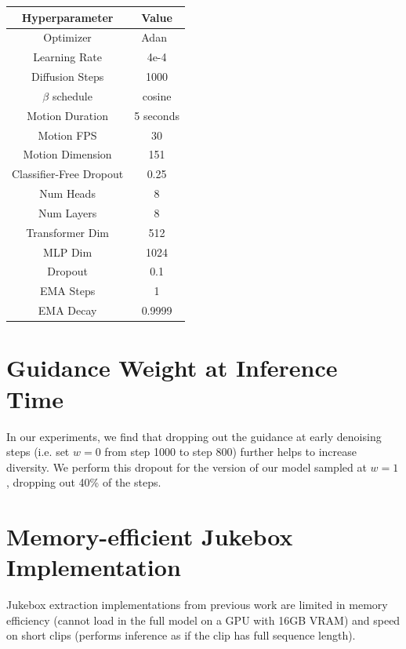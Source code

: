 \begin{tabular}{c|c} 
 \hline
 Hyperparameter & Value \\
 \hline
 Optimizer & Adan~\cite{xie2022adan} \\ 

 Learning Rate & 4e-4 \\

 Diffusion Steps & 1000 \\

 $\beta$ schedule & cosine \\

 Motion Duration & 5 seconds\\

 Motion FPS & 30\\

 Motion Dimension & 151\\

 Classifier-Free Dropout & 0.25\\

 Num Heads & 8\\

 Num Layers & 8\\

 Transformer Dim & 512\\

 MLP Dim & 1024\\

 Dropout & 0.1\\

 EMA Steps & 1\\

 EMA Decay & 0.9999\\
 \hline
\end{tabular}

\section{Guidance Weight at Inference Time}
In our experiments, we find that dropping out the guidance at early denoising steps (i.e. set $w=0$ from step 1000 to step 800) further helps to increase diversity.
We perform this dropout for the version of our model sampled at $w=1$, dropping out 40\% of the steps.

\section{Memory-efficient Jukebox Implementation}
\label{sec:appendix_juke_mem}

Jukebox extraction implementations from previous work \cite{castellon2021codified,donahue2021sheet} are limited in memory efficiency (cannot load in the full model on a GPU with 16GB VRAM) and speed on short clips (performs inference as if the clip has full sequence length).

